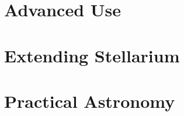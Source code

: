 \documentclass[12pt,fleqn]{book} %
\begin{document}



\part{Advanced Use}






\part{Extending Stellarium}





\part{Practical Astronomy}



\end{document}
